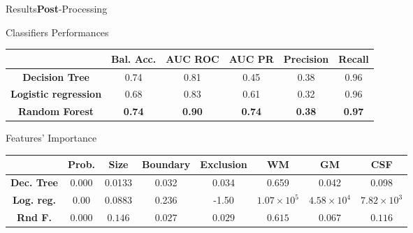 \documentclass[]{standalone}
\begin{document}
	\begin{frame}{Results}{\textbf{Post}-Processing}
	\vspace{-28pt}
	\begin{block}{Classifiers Performances}
	\begin{table}[h!]
		\centering
		\setlength{\tabcolsep}{2pt}
		\small
		\begin{tabular}{c|ccccc}
		 & \textbf{Bal. Acc.} & \textbf{AUC ROC} & \textbf{AUC PR} & \textbf{Precision} & \textbf{Recall} \\ \hline
		\textbf{Decision Tree}       & 0.74 & 0.81 & 0.45 & 0.38 & 0.96 \\
		\textbf{Logistic regression} & 0.68 & 0.83 & 0.61 & 0.32 & 0.96 \\
		\textbf{Random Forest}       & \textbf{0.74} & \textbf{0.90} & \textbf{0.74} & \textbf{0.38} & \textbf{0.97}
		\end{tabular}
	\end{table}
	\end{block}
	
	\begin{exampleblock}{Features' Importance}
	\begin{table}[h!]
		\centering
		\footnotesize
		\setlength\tabcolsep{2pt}
		\begin{tabular}{c|ccccccc}
				& \textbf{Prob.}     & \textbf{Size}        & \textbf{Boundary}     & \textbf{Exclusion} & \textbf{WM}       & \textbf{GM}        & \textbf{CSF}       \\ \hline
		\textbf{Dec. Tree} & 0.000 & 0.0133 & 0.032 & 0.034 & 0.659 & 0.042 & 0.098 \\
		\textbf{Log. reg.} & 0.00 & $0.0883$ & 0.236 & -1.50 & $1.07 \times 10^5 $ & $4.58 \times 10^4$ & $7.82 \times 10^3$ \\
		\textbf{Rnd F.} & $0.000$ & $0.146$ & $0.027$ & $0.029$  & $0.615$ & $0.067$ & $0.116$
		\end{tabular}
		\end{table}


	\vspace{-10pt}
	\end{exampleblock}

	\end{frame}
\end{document}
